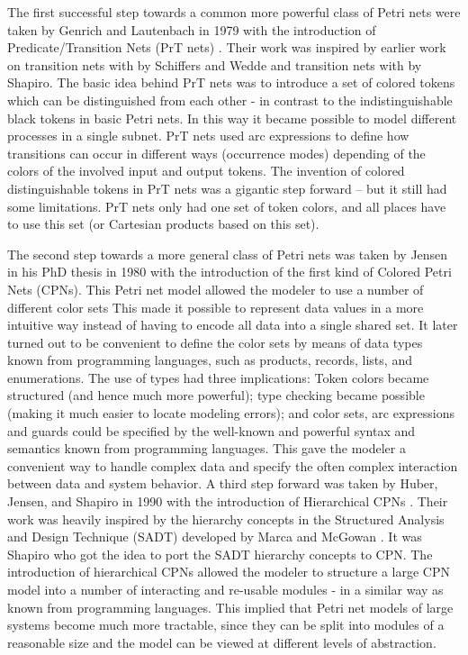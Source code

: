 The first successful step towards a common more powerful class of
Petri nets were taken by Genrich and Lautenbach in 1979 with the
introduction of Predicate/Transition Nets (PrT nets)
\cite{genrich:81}. Their work was inspired by earlier work on
transition nets with  by Schiffers and Wedde
\cite{X} and transition nets with 
\cite{Y} by Shapiro. The basic idea behind PrT nets was to introduce a
set of colored tokens which can be distinguished from each other - in
contrast to the indistinguishable black tokens in basic Petri nets. In
this way it became possible to model different processes in a single
subnet. PrT nets used arc expressions to define how transitions can
occur in different ways (occurrence modes) depending of the colors of
the involved input and output tokens. The invention of colored
distinguishable tokens in PrT nets was a gigantic step forward -- but
it still had some limitations. PrT nets only had one set of token
colors, and all places have to use this set (or Cartesian products
based on this set).

The second step towards a more general class of Petri nets was taken
by Jensen in his PhD thesis in 1980 \cite{jensen:81} with the
introduction of the first kind of Colored Petri Nets (CPNs). This
Petri net model allowed the modeler to use a number of different color
sets This made it possible to represent data values in a more
intuitive way instead of having to encode all data into a single
shared set. It later turned out to be convenient to define the color
sets by means of data types known from programming languages, such as
products, records, lists, and enumerations. The use of types had three
implications: Token colors became structured (and hence much more
powerful); type checking became possible (making it much easier to
locate modeling errors); and color sets, arc expressions and guards
could be specified by the well-known and powerful syntax and semantics
known from programming languages. This gave the modeler a convenient
way to handle complex data and specify the often complex interaction
between data and system behavior. A third step forward was taken by
Huber, Jensen, and Shapiro in 1990 with the introduction of
Hierarchical CPNs \cite{huber:91}. Their work was heavily inspired by
the hierarchy concepts in the Structured Analysis and Design Technique
(SADT) developed by Marca and McGowan \cite{X}. It was Shapiro who got
the idea to port the SADT hierarchy concepts to CPN.  The introduction
of hierarchical CPNs allowed the modeler to structure a large CPN
model into a number of interacting and re-usable modules - in a
similar way as known from programming languages. This implied that
Petri net models of large systems become much more tractable, since
they can be split into modules of a reasonable size and the model can
be viewed at different levels of abstraction.


